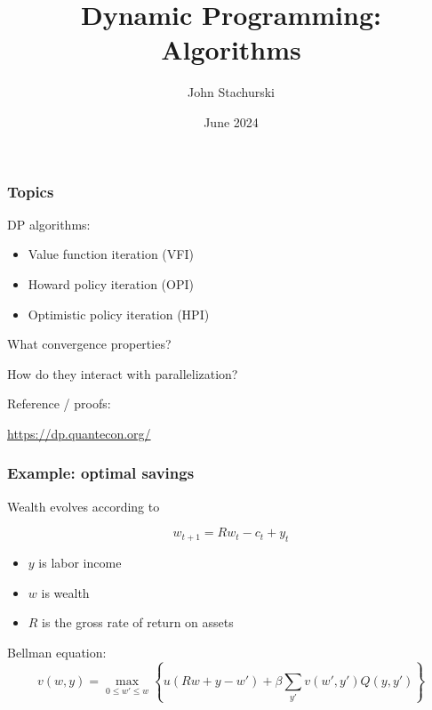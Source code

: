 \documentclass[xcolor=dvipsnames]{beamer}
\date[\today]{}
\title{Dynamic Programming: Algorithms}
\author{John Stachurski}
\date{June 2024}
\renewcommand{\leq}{\leqslant}
\renewcommand{\leq}{\leqslant}
\newcommand{\1}{\mathbbm 1}
\begin{document}
\begin{frame}
  \titlepage
\end{frame}


\begin{frame}
    \frametitle{Topics}

    DP algorithms:

    \begin{itemize}
        \item Value function iteration (VFI)
        \vspace{0.5em}
        \item Howard policy iteration (OPI)
        \vspace{0.5em}
        \item Optimistic policy iteration (HPI)
    \end{itemize}

        \vspace{0.5em}
        \vspace{0.5em}
        \vspace{0.5em}

    What convergence properties?
        \vspace{0.5em}

    How do they interact with parallelization? 

\end{frame}


\begin{frame}
    
    Reference / proofs:

    \begin{center}
        \url{https://dp.quantecon.org/}
    \end{center}
\end{frame}



\begin{frame}
    \frametitle{Example: optimal savings}
    
     Wealth evolves according to 

     \begin{equation*}
         w_{t+1} = Rw_t - c_t + y_t
     \end{equation*}


    \begin{itemize}
        \item $y$ is labor income
        \item $w$ is wealth
        \item $R$ is the gross rate of return on assets
    \end{itemize}

    \vspace{0.5em}
    \vspace{0.5em}
    Bellman equation:
    \begin{equation*}
        v(w, y) = 
        \max_{0 \leq w' \leq w}
        \left\{
            u(Rw + y - w') 
             + \beta \sum_{y'} v(w', y') Q(y, y')
        \right\}
    \end{equation*}


\end{frame}
\end{document}
